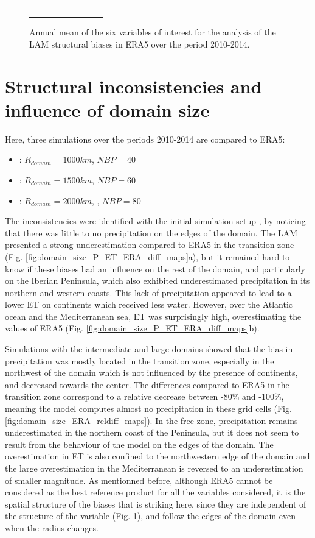 \begin{figure}[htbp]
\begin{tabular}{ccc}
\begin{subfigure}[b]{0.33\textwidth}
        \end{subfigure}
    \end{tabular}
    \caption{Annual mean of the six variables of interest for the analysis of the LAM structural biases in ERA5 over the period 2010-2014.}
    \label{fig:ERA_var_maps}
\end{figure}

\section{Structural inconsistencies and influence of domain size}
\label{sec:domain_size}
Here, three simulations over the periods 2010-2014 are compared to ERA5:
\begin{itemize}
    \item \smalld : $R_{domain} = 1000 km$, $NBP=40$
    \item \interd : $R_{domain} = 1500 km$, $NBP=60$
    \item \larged : $R_{domain} = 2000 km$, , $NBP=80$
\end{itemize}

The inconsistencies were identified with the initial simulation setup \smalld, by noticing that there was little to no precipitation on the edges of the domain. The LAM presented a strong underestimation compared to ERA5 in the transition zone (Fig. \ref{fig:domain_size_P_ET_ERA_diff_maps}a), but it remained hard to know if these biases had an influence on the rest of the domain, and particularly on the Iberian Peninsula, which also exhibited underestimated precipitation in its northern and western coasts.
This lack of precipitation appeared to lead to a lower ET on continents which received less water. However, over the Atlantic ocean and the Mediterranean sea, ET was surprisingly high, overestimating the values of ERA5 (Fig. \ref{fig:domain_size_P_ET_ERA_diff_maps}b). 

Simulations with the intermediate and large domains showed that the bias in precipitation was mostly located in the transition zone, especially in the northwest of the domain which is not influenced by the presence of continents, and decreased towards the center. 
The differences compared to ERA5 in the transition zone correspond to a relative decrease between -80\% and -100\%, meaning the model computes almost no precipitation in these grid cells (Fig. \ref{fig:domain_size_ERA_reldiff_maps}).
In the free zone, precipitation remains underestimated in the northern coast of the Peninsula, but it does not seem to result from the behaviour of the model on the edges of the domain.
The overestimation in ET is also confined to the northwestern edge of the domain and the large overestimation in the Mediterranean is reversed to an underestimation of smaller magnitude.
As mentionned before, although ERA5 cannot be considered as the best reference product for all the variables considered, it is the spatial structure of the biases that is striking here, since they are independent of the structure of the variable (Fig. \ref{fig:ERA_var_maps}), and follow the edges of the domain even when the radius changes.

